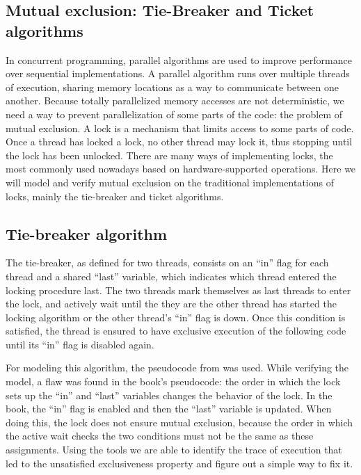 \documentclass[11pt]{article}
\theoremstyle{definition}
\theoremstyle{plain}
\begin{document}
\begin{appendices}
\section{Mutual exclusion: Tie-Breaker and Ticket algorithms}
\label{appendix:locks}
In concurrent programming, parallel algorithms are used to improve performance over sequential implementations. A parallel algorithm runs over multiple threads of execution, sharing memory locations as a way to communicate between one another. Because totally parallelized memory accesses are not deterministic, we need a way to prevent parallelization of some parts of the code: the problem of mutual exclusion. A lock is a mechanism that limits access to some parts of code. Once a thread has locked a lock, no other thread may lock it, thus stopping until the lock has been unlocked. There are many ways of implementing locks, the most commonly used nowadays based on hardware-supported operations. Here we will model and verify mutual exclusion on the traditional implementations of locks, mainly the tie-breaker and ticket algorithms.

\subsection{Tie-breaker algorithm}
The tie-breaker, as defined for two threads, consists on an ``in'' flag for each thread and a shared ``last'' variable, which indicates which thread entered the locking procedure last. The two threads mark themselves as last threads to enter the lock, and actively wait until the they are the other thread has started the locking algorithm or the other thread's ``in'' flag is down. Once this condition is satisfied, the thread is ensured to have exclusive execution of the following code until its ``in'' flag is disabled again.

For modeling this algorithm, the pseudocode from \cite{andrews2000foundations} was used. While verifying the model, a flaw was found in the book's pseudocode: the order in which the lock sets up the ``in'' and ``last'' variables changes the behavior of the lock. In the book, the ``in'' flag is enabled and then the ``last'' variable is updated. When doing this, the lock does not ensure mutual exclusion, because the order in which the active wait checks the two conditions must not be the same as these assignments. Using the tools we are able to identify the trace of execution that led to the unsatisfied exclusiveness property and figure out a simple way to fix it.


\end{appendices}
\end{document}
